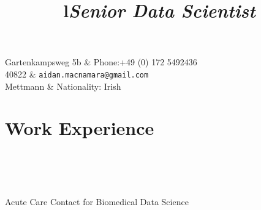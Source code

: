 \documentclass[overlapped, line, 11pt, letterpaper]{res}
\begin{document}

\setlength{\leftmargini}{1em}
\renewcommand{\labelitemi}{$\bullet$}


\renewcommand{\namefont}{\large\textbf}


\begin{resume}

\begin{ncolumn}{2}
  Gartenkampsweg 5b	& Phone:+49 (0) 172 5492436\\
  40822	& {\small \tt aidan.macnamara@gmail.com} \\
  Mettmann	& Nationality: Irish \\
\end{ncolumn}




\section{\bf Work Experience}
\begin{formatb}
\title{l} \\
\\
\body \\
\end{formatb}

\title{\it Senior Data Scientist} 
\begin{position}
Acute Care Contact for Biomedical Data Science
\end{position}


\end{resume}
\end{document}
